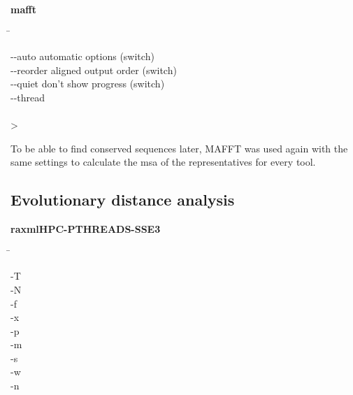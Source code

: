     \begin{leftbar}
        \textbf{mafft}
        \begin{nstabbing}
            \qquad\qquad\qquad \= \kill
        
            -{}-{}auto \> automatic options (switch)\\
        
            -{}-{}reorder \> aligned output order (switch)\\
            
            -{}-{}quiet \> don't show progress (switch)\\
            
            -{}-{}thread \\
            
            \\
            
            > 
        \end{nstabbing}
    \end{leftbar}
    
    To be able to find conserved sequences later, MAFFT was used again with the same settings to calculate the \gls{msa} of the representatives for every tool. 

\clearpage
\subsection{Evolutionary distance analysis} \label{subsec:2.2.3}

    \begin{leftbar}
        \textbf{raxmlHPC-PTHREADS-SSE3}
        \begin{nstabbing}
            \qquad \= \kill
            
            -T \\
            
            -N \\
            
            -f \\
            
            -x \\
            
            -p \\
            
            -m \\
            
            -s \\
            
            -w \\
            
            -n 
        \end{nstabbing}
    \end{leftbar}
    
